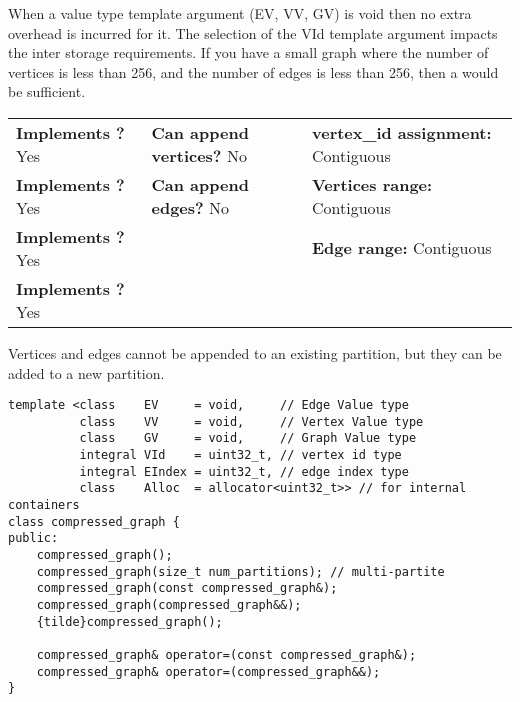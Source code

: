 When a value type template argument (EV, VV, GV) is void then no extra overhead is incurred for it. 
The selection of the VId template argument impacts the inter storage requirements. If you have a small 
graph where the number of vertices is less than 256, and the number of edges is less than 256, 
then a  would be sufficient.

\begin{table}[h]
    \setcellgapes{3pt}
    \makegapedcells
    \centering
    \begin{tabular}{|P{0.35\textwidth}|P{0.30\textwidth}|P{0.35\textwidth}|}
    \hline
    \textbf{Implements ?} Yes & \textbf{Can append vertices?} No & \textbf{vertex\_id assignment:} Contiguous\\
    \textbf{Implements ?} Yes & \textbf{Can append edges?} No & \textbf{Vertices range:} Contiguous \\
    \textbf{Implements ?} Yes &  & \textbf{Edge range:} Contiguous \\
    \textbf{Implements ?} Yes &  & \\
    \hline
    \end{tabular}
    \label{tab:compressed_graph_summary}
\end{table}
Vertices and edges cannot be appended to an existing partition, but they can be added to a new partition.

\begin{lstlisting}
template <class    EV     = void,     // Edge Value type
          class    VV     = void,     // Vertex Value type
          class    GV     = void,     // Graph Value type
          integral VId    = uint32_t, // vertex id type
          integral EIndex = uint32_t, // edge index type
          class    Alloc  = allocator<uint32_t>> // for internal containers
class compressed_graph {
public:
    compressed_graph();
    compressed_graph(size_t num_partitions); // multi-partite
    compressed_graph(const compressed_graph&);
    compressed_graph(compressed_graph&&);
    {tilde}compressed_graph();

    compressed_graph& operator=(const compressed_graph&);
    compressed_graph& operator=(compressed_graph&&);
}
\end{lstlisting}



